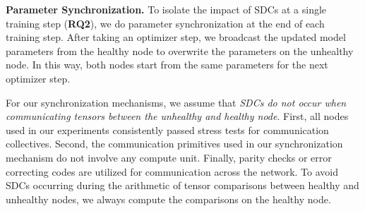 \textbf{Parameter Synchronization.} To isolate the impact of SDCs at a single training step (\textbf{RQ2}), we do parameter synchronization at the end of each training step.
After taking an optimizer step, we broadcast the updated model parameters from the healthy node to overwrite the parameters on the unhealthy node. In this way, both nodes start from the same parameters for the next optimizer step.

For our synchronization mechanisms, we assume that \emph{SDCs do not occur when communicating tensors between the unhealthy and healthy node}. 
First, all nodes used in our experiments consistently passed stress tests for communication collectives. Second, the communication primitives used in our synchronization mechanism do not involve any compute unit. Finally, parity checks or error correcting codes are utilized for communication across the network. 
To avoid SDCs occurring during the arithmetic of tensor comparisons between healthy and unhealthy nodes, we always compute the comparisons on the healthy node.

